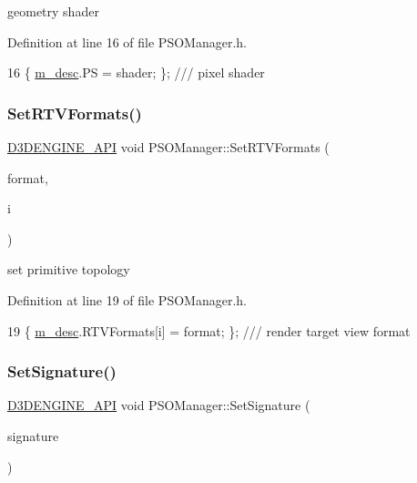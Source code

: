 geometry shader 



Definition at line 16 of file P\+S\+O\+Manager.\+h.


\begin{DoxyCode}
16 \{ \mbox{\hyperlink{class_p_s_o_manager_ac5a7e346b2d641709d7146f5a0f45dee}{m\_desc}}.PS = shader; \}; \textcolor{comment}{/// pixel shader}
\end{DoxyCode}
\mbox{\label{class_p_s_o_manager_af22ff455998aed24fb064297a0578125}} 
\subsubsection{\texorpdfstring{Set\+R\+T\+V\+Formats()}{SetRTVFormats()}}
{\footnotesize\ttfamily \mbox{\hyperlink{stdafx_8h_a8ee2d990c5dfba7794dd2b60741d7722}{D3\+D\+E\+N\+G\+I\+N\+E\+\_\+\+A\+PI}} void P\+S\+O\+Manager\+::\+Set\+R\+T\+V\+Formats (\begin{DoxyParamCaption}\item[{const D\+X\+G\+I\+\_\+\+F\+O\+R\+M\+AT}]{format,  }\item[{const int}]{i }\end{DoxyParamCaption})\hspace{0.3cm}{\ttfamily [inline]}}



set primitive topology 



Definition at line 19 of file P\+S\+O\+Manager.\+h.


\begin{DoxyCode}
19 \{ \mbox{\hyperlink{class_p_s_o_manager_ac5a7e346b2d641709d7146f5a0f45dee}{m\_desc}}.RTVFormats[i] = format; \}; \textcolor{comment}{/// render target view format }
\end{DoxyCode}
\mbox{\label{class_p_s_o_manager_ad1d6778bb35a972ab295b0dd5912ea8c}} 
\subsubsection{\texorpdfstring{Set\+Signature()}{SetSignature()}}
{\footnotesize\ttfamily \mbox{\hyperlink{stdafx_8h_a8ee2d990c5dfba7794dd2b60741d7722}{D3\+D\+E\+N\+G\+I\+N\+E\+\_\+\+A\+PI}} void P\+S\+O\+Manager\+::\+Set\+Signature (\begin{DoxyParamCaption}\item[{I\+D3\+D12\+Root\+Signature $\ast$}]{signature }\end{DoxyParamCaption})\hspace{0.3cm}{\ttfamily [inline]}}




